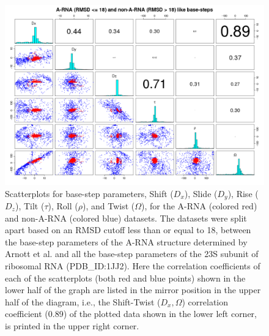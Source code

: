\begin{figure}
 \centering
\includegraphics[angle=90, scale=0.48]{Chapter2/warna_step.png}
\caption{Scatterplots for base-step parameters, Shift ($D_{x}$), Slide
  ($D_{y}$), Rise  ($D_{z}$), Tilt ($\tau$), Roll  ($\rho$), and Twist
  ($\Omega$), for the A-RNA (colored red) and non-A-RNA (colored blue)
  datasets.  The  datasets were  split apart based  on an  RMSD cutoff
  less than  or equal to 18,  between the base-step  parameters of the
  A-RNA structure  determined by Arnott et  al.  \cite{arnott1973} and
  all the  base-step parameters  of the 23S  subunit of  ribosomal RNA
  (PDB\_ID:1JJ2).  Here  the correlation  coefficients of each  of the
  scatterplots (both red  and blue points) shown in  the lower half of
  the graph are listed in the mirror position in the upper half of the
  diagram,  i.e.,   the  Shift-Twist  ($D_{x},   \Omega$)  correlation
  coefficient  (0.89) of  the plotted  data  shown in  the lower  left
  corner, is printed in the upper right corner.}
\label{fig:allsteps}
\end{figure}


